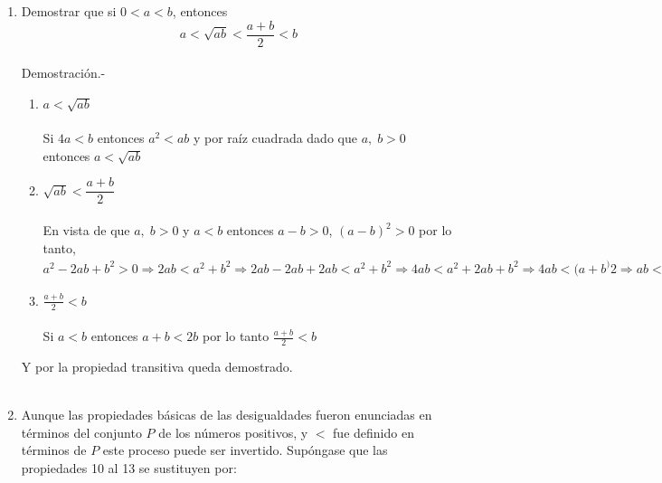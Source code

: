 \begin{enumerate}[\bfseries 1.]
\item Demostrar que si $0<a < b$, entonces
$$a<\sqrt{ab}<\dfrac{a+b}{2} < b$$\\
Demostración.- \;
\begin{enumerate}[1.]
\item $a<\sqrt{ab}$\\\\
Si \; $4a<b$ entonces $a^2<ab$ y por raíz cuadrada dado que $a,\;b>0$ entonces $a<\sqrt{ab}$\\
\item $\sqrt{ab}<\dfrac{a+b}{2}$\\\\
En vista de que $a, \; b > 0$ y $a<b$ entonces $a-b>0$, \; $(a-b)^2>0$ por lo tanto, $a^2-2ab+b^2>0 \Rightarrow 2ab< a^2+b^2 \Rightarrow 2ab-2ab+2ab<a^2+b^2 \Rightarrow 4ab < a^2+2ab +b^2 \Rightarrow 4ab < (a+b^)2 \Rightarrow ab < \displaystyle \left( \frac{a+b}{2} \right) ^2 \Rightarrow \sqrt{ab}<\frac{a+b}{2} $ \\
\item $\displaystyle\frac{a+b}{2}<b$\\\\
Si $a<b$ entonces $a+b<2b$ por lo tanto $\displaystyle\frac{a+b}{2}<b$\\
\end{enumerate}
Y por la propiedad transitiva queda demostrado.\\\\
 
\item Aunque las propiedades básicas de las desigualdades fueron enunciadas en términos del conjunto $P$ de los números positivos, y $<$ fue definido en términos de $P$ este proceso puede ser invertido. Supóngase que las propiedades 10 al 13 se sustituyen por:\\


\end{enumerate}
